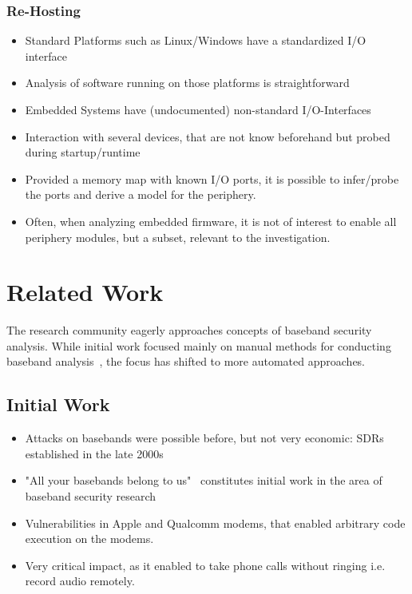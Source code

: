 \documentclass[a4paper,11pt,oneside]{report}
\begin{document}
\subsection{Re-Hosting}
\begin{itemize}
  \item Standard Platforms such as Linux/Windows have a standardized I/O interface
  \item Analysis of software running on those platforms is straightforward
  \item Embedded Systems have (undocumented) non-standard I/O-Interfaces
  \item Interaction with several devices, that are not know beforehand but probed during startup/runtime
  \item Provided a memory map with known I/O ports, it is possible to infer/probe the ports and derive a model for the periphery.
  \item Often, when analyzing embedded firmware, it is not of interest to enable all periphery modules, but a subset, relevant to the investigation.
\end{itemize}

\chapter{Related Work}

The research community eagerly approaches concepts of baseband security analysis.
While initial work focused mainly on manual methods for conducting baseband analysis~\cite{}, the focus has shifted to more automated approaches.

\section{Initial Work}

\begin{itemize}
  \item Attacks on basebands were possible before, but not very economic: SDRs established in the late 2000s
  \item "All your basebands belong to us"~\cite{Weinmann10} constitutes initial work in the area of baseband security research
  \item Vulnerabilities in Apple and Qualcomm modems, that enabled arbitrary code execution on the modems. 
  \item Very critical impact, as it enabled to take phone calls without ringing i.e. record audio remotely.
\end{itemize}
\end{document}
